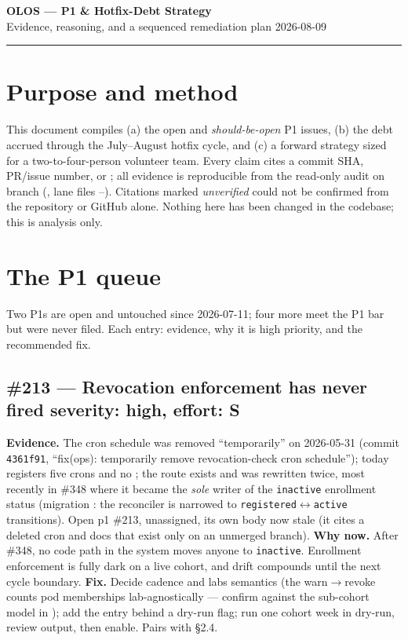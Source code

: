 \documentclass[10pt]{article}
\newcommand{\gh}[1]{\mbox{\##1}}
\newcommand{\sev}[1]{\textbf{#1}}
\begin{document}
{\LARGE\bfseries OLOS --- P1 \& Hotfix-Debt Strategy}\\[2pt]
{\large Evidence, reasoning, and a sequenced remediation plan \hfill \normalsize 2026-08-09}

\vspace{2pt}\hrule\vspace{6pt}

\section{Purpose and method}
This document compiles (a) the open and \emph{should-be-open} P1 issues, (b) the debt accrued through the July--August hotfix cycle, and (c) a forward strategy sized for a two-to-four-person volunteer team. Every claim cites a commit SHA, PR/issue number, or ; all evidence is reproducible from the read-only audit on branch  (, lane files --). Citations marked \emph{unverified} could not be confirmed from the repository or GitHub alone. Nothing here has been changed in the codebase; this is analysis only.

\section{The P1 queue}
Two P1s are open and untouched since 2026-07-11; four more meet the P1 bar but were never filed. Each entry: evidence, why it is high priority, and the recommended fix.

\subsection{\gh{213} --- Revocation enforcement has never fired \hfill \sev{severity: high, effort: S}}
\textbf{Evidence.} The cron schedule was removed ``temporarily'' on 2026-05-31 (commit \texttt{4361f91}, ``fix(ops): temporarily remove revocation-check cron schedule'');  today registers five crons and no ; the route exists and was rewritten twice, most recently in \gh{348} where it became the \emph{sole} writer of the \texttt{inactive} enrollment status (migration : the reconciler is narrowed to \texttt{registered}$\leftrightarrow$\texttt{active} transitions). Open p1 \gh{213}, unassigned, its own body now stale (it cites a deleted cron and docs that exist only on an unmerged branch).
\textbf{Why now.} After \gh{348}, no code path in the system moves anyone to \texttt{inactive}. Enrollment enforcement is fully dark on a live cohort, and drift compounds until the next cycle boundary.
\textbf{Fix.} Decide cadence and labs semantics (the warn$\rightarrow$revoke counts pod memberships lab-agnostically --- confirm against the sub-cohort model in ); add the  entry behind a dry-run flag; run one cohort week in dry-run, review output, then enable. Pairs with \S2.4.
\end{document}
